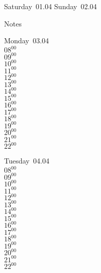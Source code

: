\documentclass[11pt,a4paper]{book}\usepackage[]{graphicx}\usepackage[]{color}
\begin{document}
\begin{weekendbox}
  Saturday~01.04
  \tcblower
  Sunday~02.04
\end{weekendbox} %
\begin{notebox}
  Notes
\end{notebox}
\clearpage
\begin{headerbox}
\end{headerbox}
\begin{weekdaybox}
  Monday~03.04\\
  { 
  \vfill
  $08^{00}$\\
$09^{00}$\\
$10^{00}$\\
$11^{00}$\\
$12^{00}$\\
$13^{00}$\\
$14^{00}$\\
$15^{00}$\\
$16^{00}$\\
$17^{00}$\\
$18^{00}$\\
$19^{00}$\\
$20^{00}$\\
$21^{00}$\\
$22^{00}$\\
  }
\end{weekdaybox}
\begin{weekdaybox}
  Tuesday~04.04\\
  { 
  \vfill
  $08^{00}$\\
$09^{00}$\\
$10^{00}$\\
$11^{00}$\\
$12^{00}$\\
$13^{00}$\\
$14^{00}$\\
$15^{00}$\\
$16^{00}$\\
$17^{00}$\\
$18^{00}$\\
$19^{00}$\\
$20^{00}$\\
$21^{00}$\\
$22^{00}$\\
  }
\end{weekdaybox}
\end{document}

